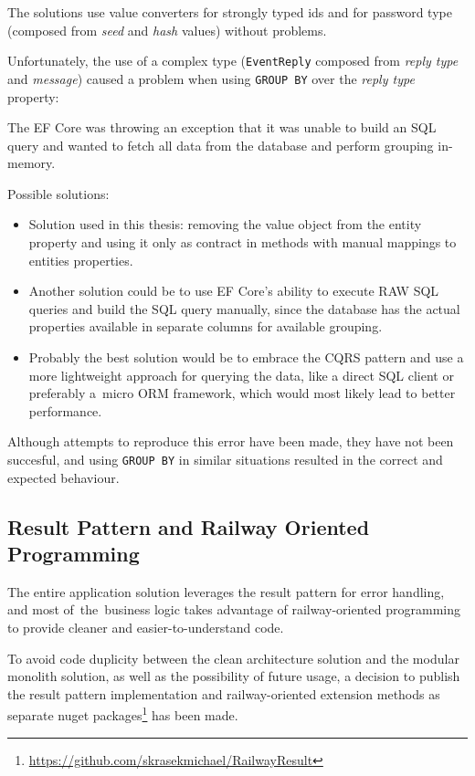 The solutions use value converters for strongly typed ids and for password type (composed from \textit{seed} and \textit{hash} values) without problems.

Unfortunately, the use of a complex type (\texttt{EventReply} composed from \textit{reply type} and \textit{message}) caused a problem when using \texttt{GROUP BY} over the \textit{reply type} property: 

The EF Core was throwing an exception that it was unable to build an SQL query and wanted to fetch all data from the database and perform grouping in-memory.

Possible solutions:
\begin{itemize}
    \item Solution used in this thesis: removing the value object from the entity property and using it only as contract in methods with manual mappings to entities properties.
    
    \item Another solution could be to use EF Core's ability to execute RAW SQL queries and build the SQL query manually, since the database has the actual properties available in separate columns for available grouping.
    
    \item Probably the best solution would be to embrace the CQRS pattern and use a more lightweight approach for querying the data, like a direct SQL client or preferably a~micro ORM framework, which would most likely lead to better performance.
\end{itemize}

Although attempts to reproduce this error have been made, they have not been succesful, and using \texttt{GROUP BY} in similar situations resulted in the correct and expected behaviour.

\subsection{Result Pattern and Railway Oriented Programming}
\label{interesting:rp_rop}
The entire application solution leverages the result pattern for error handling, and most of~the~business logic takes advantage of railway-oriented programming to provide cleaner and easier-to-understand code. 

To avoid code duplicity between the clean architecture solution and the modular monolith solution, as well as the possibility of future usage, a decision to publish the result pattern implementation and railway-oriented extension methods as separate nuget packages\footnote{\url{https://github.com/skrasekmichael/RailwayResult}} has been made. 

